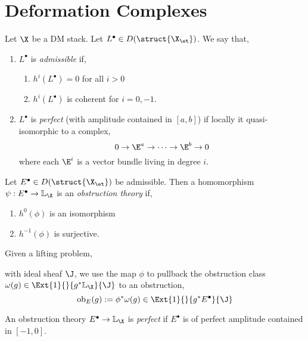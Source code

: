 \documentclass[12pt]{article}
\begin{document}
\section{Deformation Complexes}

\newcommand{\LL}{\mathbb{L}}
\newcommand{\ob}{\mathrm{ob}}

\begin{defn}
Let $\X$ be a DM stack. Let $L^\bullet \in D(\struct{\X_{\et}})$. We say that, 
\begin{enumerate}
\item $L^\bullet$ is \textit{admissible} if,
\begin{enumerate}
\item $h^i(L^\bullet) = 0$ for all $i > 0$
\item $h^i(L^\bullet)$ is coherent for $i = 0,-1$.
\end{enumerate}
\item $L^\bullet$ is \textit{perfect} (with amplitude contained in $[a,b]$) if locally it quasi-isomorphic to a complex,
\[ 0 \to \E^a \to \cdots \to \E^b \to 0 \]
where each $\E^i$ is a vector bundle living in degree $i$. 
\end{enumerate}
\end{defn}

\begin{defn}
Let $E^\bullet \in D(\struct{\X_\et})$ be admissible. Then a homomorphism $\psi : E^\bullet \to \LL_{\X}$ is an \textit{obstruction theory} if,
\begin{enumerate}
\item $h^0(\phi)$ is an isomorphism
\item $h^{-1}(\phi)$ is surjective.
\end{enumerate}
\end{defn}

\begin{rmk}
Given a lifting problem,
\begin{center}
\end{center}
with ideal sheaf $\J$, we use the map $\phi$ to pullback the obstruction class $\omega(g) \in \Ext{1}{}{g^* \LL_{\X}}{\J}$ to an obstruction,
\[ \ob_{E}(g) := \phi^* \omega(g) \in \Ext{1}{}{g^* E^\bullet}{\J} \]
\end{rmk}


\begin{defn}
An obstruction theory $E^\bullet \to \LL_{\X}$ is \textit{perfect} if $E^\bullet$ is of perfect amplitude contained in $[-1,0]$.
\end{defn}
\end{document}
